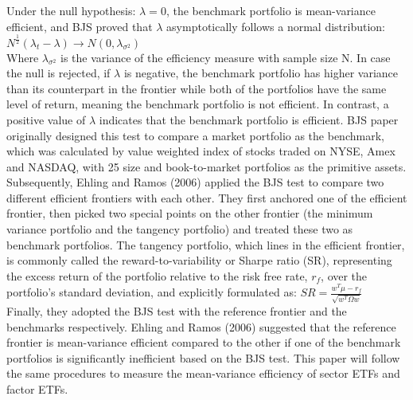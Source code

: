 Under the null hypothesis: $\lambda=0$, the benchmark portfolio is mean-variance efficient, and BJS proved that $\lambda$ asymptotically follows a normal distribution:\\
$ N^{\frac{1}{2}} (\lambda_t - \lambda)\to N(0,\lambda_{\sigma^2})$\\
Where $\lambda_{\sigma^2}$ is the variance of the efficiency measure with sample size N.
In case the null is rejected, if $\lambda$ is negative, the benchmark portfolio has higher variance than its counterpart in the frontier while both of the portfolios have the same level of return, meaning the benchmark portfolio is not efficient. In contrast, a positive value of $\lambda$ indicates that the benchmark portfolio is efficient.
BJS paper originally designed this test to compare a market portfolio as the benchmark, which was calculated by value weighted index of stocks traded on NYSE, Amex and NASDAQ, with 25 size and book-to-market portfolios as the primitive assets. Subsequently, Ehling and Ramos (2006) applied the BJS test to compare two different efficient frontiers with each other. They first anchored one of the efficient frontier, then picked two special points on the other frontier (the minimum variance portfolio and the tangency portfolio) and treated these two as benchmark portfolios. The tangency portfolio, which lines in the efficient frontier, is commonly called the reward-to-variability or Sharpe ratio (SR), representing the excess return of the portfolio relative to the risk free rate, $r_f$, over the portfolio’s standard deviation, and explicitly formulated as: $SR=\frac{w^T\mu - r_f}{\sqrt{w^T\Omega w}}$\\
Finally, they adopted the BJS test with the reference frontier and the benchmarks respectively. Ehling and Ramos (2006) suggested that the reference frontier is mean-variance efficient compared to the other if one of the benchmark portfolios is significantly inefficient based on the BJS test. This paper will follow the same procedures to measure the mean-variance efficiency of sector ETFs and factor ETFs.
